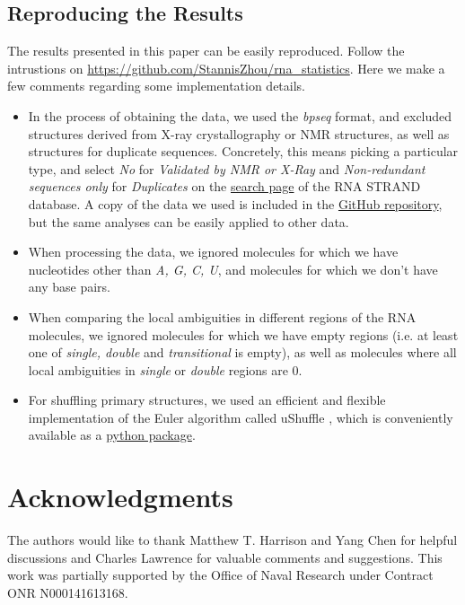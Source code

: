 \documentclass[10pt,letterpaper]{article}
\begin{document}
\subsection*{Reproducing the Results}
The results presented in this paper can be easily reproduced. Follow the intrustions on \url{https://github.com/StannisZhou/rna_statistics}. Here we make a few comments regarding some implementation details.
\begin{itemize}
	\item In the process of obtaining the data, we used the \textit{bpseq} format, and excluded structures derived from X-ray crystallography or NMR structures, as well as structures for duplicate sequences. Concretely, this means picking a particular type, and select \textit{No} for \textit{Validated by NMR or X-Ray} and \textit{Non-redundant sequences only} for \textit{Duplicates} on the \href{http://www.rnasoft.ca/strand/search.php}{search page} of the RNA STRAND database. A copy of the data we used is included in the \href{https://github.com/StannisZhou/rna_statistics/tree/master/data}{GitHub repository}, but the same analyses can be easily  applied to other data.
	\item When processing the data, we ignored molecules for which we have nucleotides other than \textit{A, G, C, U}, and molecules for which we don't have any base pairs.
	\item When comparing the local ambiguities in different regions of the RNA molecules, we ignored molecules for which we have empty regions (i.e. at least one of \textit{single, double} and \textit{transitional} is empty), as well as molecules where all local ambiguities in \textit{single} or \textit{double} regions are 0.
	\item For shuffling primary structures, we used an efficient and flexible implementation of the Euler algorithm\cite{Kandel1996-kz, Fitch1983-ec, Altschul1985-nq} called uShuffle \cite{Jiang2008-yj}, which is conveniently available as a \href{https://github.com/guma44/ushuffle}{python package}.
\end{itemize}

\section*{Acknowledgments}
The authors would like to thank Matthew T. Harrison and Yang Chen for helpful discussions and Charles Lawrence for valuable comments and suggestions. This work was partially supported by the Office of Naval Research under Contract ONR N000141613168.

\nolinenumbers


\end{document}
